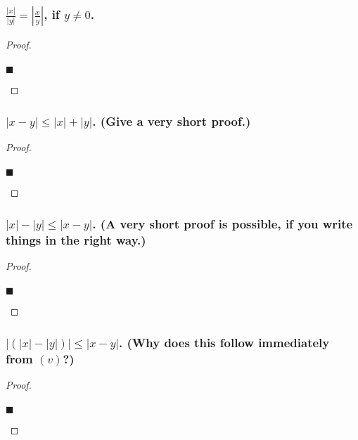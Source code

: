 \documentclass[letterpaper, 10 pt, conference]{ieeeconf}  %
\begin{document}
\subsubsection{\textbf{$\frac{\left\lvert x \right\rvert}{\left\lvert y \right\rvert} = \left\lvert \frac{x}{y} \right\rvert$, if $y \neq 0$.}}
\begin{proof}
\begin{align}
    
\end{align}
\begin{flushright}
$\blacksquare$
\end{flushright}
\end{proof}

\subsubsection{\textbf{$\left\lvert x - y \right\rvert \leq \left\lvert x \right\rvert + \left\lvert y \right\rvert$. (Give a very short proof.)}}
\begin{proof}
\begin{align}
    
\end{align}
\begin{flushright}
$\blacksquare$
\end{flushright}
\end{proof}

\subsubsection{\textbf{$\left\lvert x \right\rvert - \left\lvert y \right\rvert \leq \left\lvert x - y \right\rvert$. (A very short proof is possible, if you write things in the right way.)}}
\begin{proof}
\begin{align}
    
\end{align}
\begin{flushright}
$\blacksquare$
\end{flushright}
\end{proof}

\subsubsection{\textbf{$\left\lvert (\left\lvert x \right\rvert - \left\lvert y \right\rvert)\right\rvert \leq \left\lvert x - y \right\rvert$. (Why does this follow immediately from $(v)$?)}}
\begin{proof}
\begin{align}
    
\end{align}
\begin{flushright}
$\blacksquare$
\end{flushright}
\end{proof}
\end{document}
